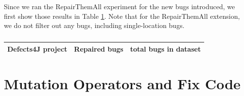 \documentclass[10pt,journal,compsoc]{IEEEtran}
\newcommand\todo[1]{\textcolor{red}{#1}}
\begin{document}
 


Since we ran the RepairThemAll experiment for the new bugs introduced, we first show those results in Table \ref{tab:rta_v2}.
Note that for the RepairThemAll extension, we do not filter out any bugs, including single-location bugs. 

 \begin{table}
\begin{center}
\begin{tabular}{l | r r }
\toprule
Defects4J project & Repaired bugs & total bugs in dataset \\
\midrule

\bottomrule
\end{tabular}
\end{center}
\caption{\label{tab:rta_v2} \small }
\end{table}

 

\section{Mutation Operators and Fix Code}
\label{sec:mutops}
\end{document}
